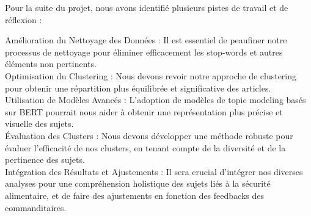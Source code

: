 \documentclass{article}
\begin{document}
Pour la suite du projet, nous avons identifié plusieurs pistes de travail et de réflexion :

Amélioration du Nettoyage des Données : Il est essentiel de peaufiner notre processus de nettoyage pour éliminer efficacement les stop-words et autres éléments non pertinents. \\

Optimisation du Clustering : Nous devons revoir notre approche de clustering pour obtenir une répartition plus équilibrée et significative des articles.\\

Utilisation de Modèles Avancés : L'adoption de modèles de topic modeling basés sur BERT pourrait nous aider à obtenir une représentation plus précise et visuelle des sujets.\\

Évaluation des Clusters : Nous devons développer une méthode robuste pour évaluer l'efficacité de nos clusters, en tenant compte de la diversité et de la pertinence des sujets. \\

Intégration des Résultats et Ajustements : Il sera crucial d'intégrer nos diverses analyses pour une compréhension holistique des sujets liés à la sécurité alimentaire, et de faire des ajustements en fonction des feedbacks des commanditaires.
\end{document}

